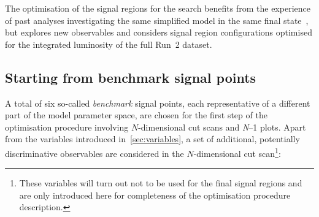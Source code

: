 The optimisation of the signal regions for the \onelepton search benefits from the experience of past analyses investigating the same simplified model in the same final state~\cite{SUSY-2013-23,SUSY-2017-01}, but explores new observables and considers signal region configurations optimised for the integrated luminosity of the full Run~2 dataset. 

\subsection{Starting from benchmark signal points}

A total of six so-called \textit{benchmark} signal points, each representative of a different part of the model parameter space, are chosen for the first step of the optimisation procedure involving $N$-dimensional cut scans and \textit{N}--1 plots.
Apart from the variables introduced in~\cref{sec:variables}, a set of additional, potentially discriminative observables are considered in the $N$-dimensional cut scan\footnote{These variables will turn out not to be used for the final signal regions and are only introduced here for completeness of the optimisation procedure description.}:
